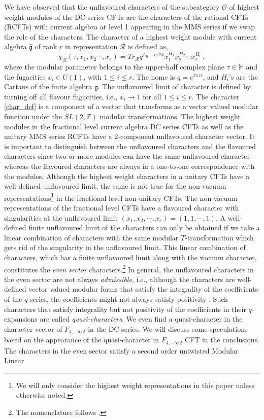 \documentclass[a4paper,12pt]{article}
\begin{document}
We have observed that the unflavoured characters of the subcategory $\mathcal{O}$ of highest weight modules of the DC series CFTs are the characters of the rational CFTs (RCFTs) with current algebra at level 1 appearing in the MMS series if we swap the role of the characters. The character of a highest weight module with current algebra $\hat{\mathfrak{g}}$ of rank $r$ in representation $\mathcal{R}$ is defined as,
\begin{equation}\label{char_def}
    \chi_{\mathcal{R}}(\tau, x_1,x_2\cdots, x_r)=Tr_{\mathcal{R}}q^{L_0-c/24}x_1^{H_1} x_2^{H_2}\cdots x_r^{H_r}\, ,
\end{equation}
where the modular parameter belongs to the upper-half complex plane $\tau\in \mathbb{H}$ and the fugacities $x_i\in U(1)$, with $1\leq i\leq r$. The nome is $q=e^{2\pi i \tau}$, and $H_i$'s are the Cartans of the finite algebra $\mathfrak{g}$. The unflavoured limit of character is defined by turning off all flavour fugacities, i.e., $x_i\to 1$ for all $1\leq i\leq r$. The character \eqref{char_def} is a component of a vector that transforms as a vector valued modular function under the $SL(2,\mathbb{Z})$ modular transformations. The highest weight modules in the fractional level current algebra DC series CFTs as well as the unitary MMS series RCFTs have a 2-component unflavoured character vector. It is important to distinguish between the unflavoured characters and the flavoured characters since two or more modules can have the same unflavoured character whereas the flavoured characters are always in a one-to-one correspondence with the modules. Although the highest weight characters in a unitary CFTs have a well-defined unflavoured limit, the same is not true for the non-vacuum representations\footnote{We will only consider the highest weight representations in this paper unless otherwise noted.} in the fractional level non-unitary CFTs. The non-vacuum representations of the fractional level CFTs have a flavoured character with singularities at the unflavoured limit $(x_1,x_2,\cdots, x_r)=(1,1,\cdots,1)$. A well-defined finite unflavoured limit of the characters can only be obtained if we take a linear combination of characters with the same modular $T$-transformation which gets rid of the singularity in the unflavoured limit. This linear combination of characters, which has a finite unflavoured limit along with the vacuum character, constitutes the \textit{even sector} characters.\footnote{The nomenclature follows \cite{Mukhi:1989bp}.} In general, the unflavoured characters in the even sector are not always \textit{admissible}, i.e., although the characters are well-defined vector valued modular forms that satisfy the integrality of the coefficients of the $q$-series, the coefficients might not always satisfy positivity \cite{Grover:2022jrc}. Such characters that satisfy integrality but not positivity of the coefficients in their $q$-expansions are called \textit{quasi-characters}. We even find a quasi-character in the character vector of $F_{4,-5/2}$ in the DC series. We will discuss some speculations based on the appearance of the quasi-character in $F_{4,-5/2}$ CFT in the conclusions. The characters in the even sector satisfy a second order untwisted Modular Linear 
\end{document}
